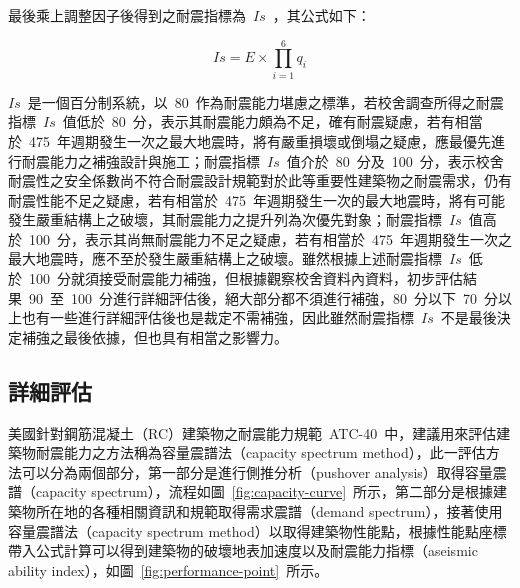 最後乘上調整因子後得到之耐震指標為~$Is$~，其公式如下：

  \begin{equation}Is = E \times \prod_{i=1}^6 q_i \end{equation} 


$Is$~是一個百分制系統，以~80~作為耐震能力堪慮之標準，若校舍調查所得之耐震指標~$Is$~值低於~80~分，表示其耐震能力頗為不足，確有耐震疑慮，若有相當於~475~年週期發生一次之最大地震時，將有嚴重損壞或倒塌之疑慮，應最優先進行耐震能力之補強設計與施工；耐震指標~$Is$~值介於~80~分及~100~分，表示校舍耐震性之安全係數尚不符合耐震設計規範對於此等重要性建築物之耐震需求，仍有耐震性能不足之疑慮，若有相當於~475~年週期發生一次的最大地震時，將有可能發生嚴重結構上之破壞，其耐震能力之提升列為次優先對象；耐震指標~$Is$~值高於~100~分，表示其尚無耐震能力不足之疑慮，若有相當於~475~年週期發生一次之最大地震時，應不至於發生嚴重結構上之破壞。雖然根據上述耐震指標~$Is$~低於~100~分就須接受耐震能力補強，但根據觀察校舍資料內資料，初步評估結果~90~至~100~分進行詳細評估後，絕大部分都不須進行補強，80~分以下~70~分以上也有一些進行詳細評估後也是裁定不需補強，因此雖然耐震指標~$Is$~不是最後決定補強之最後依據，但也具有相當之影響力。


\subsection{詳細評估}

美國針對鋼筋混凝土（RC）建築物之耐震能力規範~ATC-40\cite{applied1996seismic}~中，建議用來評估建築物耐震能力之方法稱為容量震譜法（capacity spectrum method），此一評估方法可以分為兩個部分，第一部分是進行側推分析（pushover analysis）取得容量震譜（capacity spectrum），流程如圖~\ref{fig:capacity-curve}~所示，第二部分是根據建築物所在地的各種相關資訊和規範取得需求震譜（demand spectrum），接著使用容量震譜法（capacity spectrum method）以取得建築物性能點，根據性能點座標帶入公式計算可以得到建築物的破壞地表加速度以及耐震能力指標（aseismic ability index），如圖~\ref{fig:performance-point}~所示。

